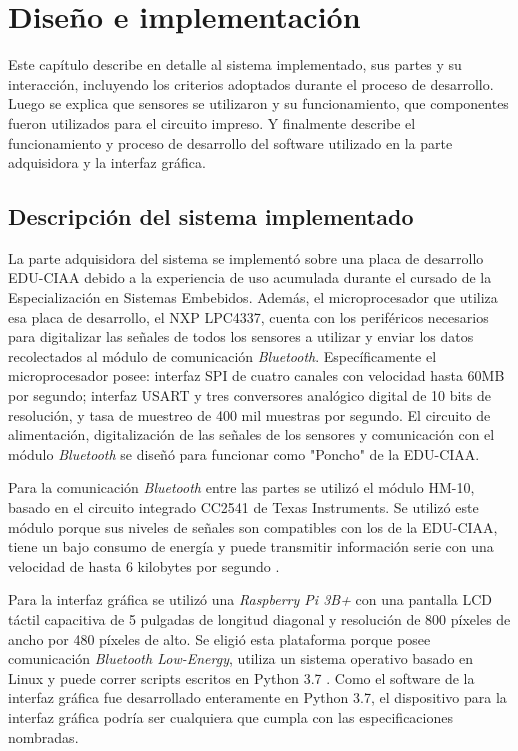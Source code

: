 \chapter{Diseño e implementación} %

\label{Chapter3}

Este capítulo describe en detalle al sistema implementado, sus partes y su interacción, incluyendo los criterios adoptados durante el proceso de desarrollo. Luego se explica que sensores se utilizaron y su funcionamiento, que componentes fueron utilizados para el circuito impreso. Y finalmente describe el funcionamiento y proceso de desarrollo del software utilizado en la parte adquisidora y la interfaz gráfica.

\section{Descripción del sistema implementado}

La parte adquisidora del sistema se implementó sobre una placa de desarrollo EDU-CIAA debido a la experiencia de uso acumulada durante el cursado de la Especialización en Sistemas Embebidos. Además, el microprocesador que utiliza esa placa de desarrollo, el NXP LPC4337, cuenta con los periféricos necesarios para digitalizar las señales de todos los sensores a utilizar y enviar los datos recolectados al módulo de comunicación \textit{Bluetooth}. Específicamente el microprocesador posee: interfaz SPI de cuatro canales con velocidad hasta 60MB por segundo; interfaz USART y tres conversores analógico digital de 10 bits de resolución, y tasa de muestreo de 400 mil muestras por segundo. El circuito de alimentación, digitalización de las señales de los sensores y comunicación con el módulo \textit{Bluetooth} se diseñó para funcionar como "Poncho"  \cite{poncho} de la EDU-CIAA.

Para la comunicación \textit{Bluetooth} entre las partes se utilizó el módulo HM-10, basado en el circuito integrado CC2541 de Texas Instruments. Se utilizó este módulo porque sus niveles de señales son compatibles con los de la EDU-CIAA, tiene un bajo consumo de energía y puede transmitir información serie con una velocidad de hasta 6 kilobytes por segundo \cite{HM-10}.

Para la interfaz gráfica se utilizó una \textit{Raspberry Pi 3B+} con una pantalla LCD táctil capacitiva de 5 pulgadas de longitud diagonal y resolución de 800 píxeles de ancho por 480 píxeles de alto. Se eligió esta plataforma porque posee comunicación \textit{Bluetooth Low-Energy}, utiliza un sistema operativo basado en Linux y puede correr scripts escritos en Python 3.7 \cite{raspberrypi}. Como el software de la interfaz gráfica fue desarrollado enteramente en Python 3.7, el dispositivo para la interfaz gráfica podría ser cualquiera que cumpla con las especificaciones nombradas.

